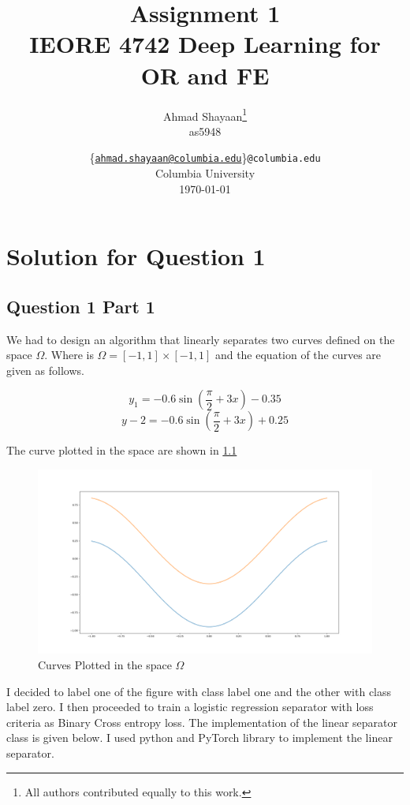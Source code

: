 \documentclass[12pt]{report}
\title{\Large{\textbf{Assignment 1}}\\\Large{IEORE 4742 Deep Learning for OR and FE}}
\author{
    Ahmad Shayaan\thanks{All authors contributed equally to this work.} \\as5948
    }
\date{
\{\href{mailto:ahmad.shayaan@columbia.edu}{\texttt{\small{ahmad.shayaan@columbia.edu}}}\}\texttt{\small{@columbia.edu}}\\
    Columbia University\\
    \today}
\begin{document}
\maketitle
\tableofcontents

\pagebreak

\chapter{Solution for Question 1}
\section{Question 1 Part 1}
We had to design an algorithm that linearly separates two curves defined on the space $\Omega$. Where is $\Omega = [-1,1] \times [-1,1]$ and the equation of the curves are given as follows.

\begin{equation*}
	y_1 = -0.6\sin{(\frac{\pi}{2} + 3x)} - 0.35 
\end{equation*}
\begin{equation*}
	y-2 = -0.6\sin{(\frac{\pi}{2} +3x)} + 0.25
\end{equation*}

\noindent The curve plotted in the space are shown in \figurename{\ref*{fig:1}}
\begin{figure}[H]
	\begin{center}
		\includegraphics[scale = 0.3]{"que1a_curve"}
		\caption{Curves Plotted in the space $\Omega$}
		\label{fig:1}
	\end{center}
\end{figure}

I decided to label one of the figure with class label one and the other with class label zero. I then proceeded to train a logistic regression separator with loss criteria as Binary Cross entropy loss. The implementation of the linear separator class is given below. I used python and PyTorch library to implement the linear separator.
\end{document}
